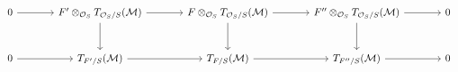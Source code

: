 \[\begin{tikzcd}[column sep=large,row sep=large]
0 \arrow[r] & F'\otimes_{\mathcal O_S}T_{\mathcal O_S/S}(\mathcal M) \arrow[r] \arrow[d] & F\otimes_{\mathcal O_S}T_{\mathcal O_S/S}(\mathcal M) \arrow[r] \arrow[d] & F''\otimes_{\mathcal O_S}T_{\mathcal O_S/S}(\mathcal M) \arrow[r] \arrow[d] & 0\\
0 \arrow[r] & T_{F'/S}(\mathcal M) \arrow[r] & T_{F/S}(\mathcal M) \arrow[r] & T_{F''/S}(\mathcal M) \arrow[r] & 0
\end{tikzcd}\]
